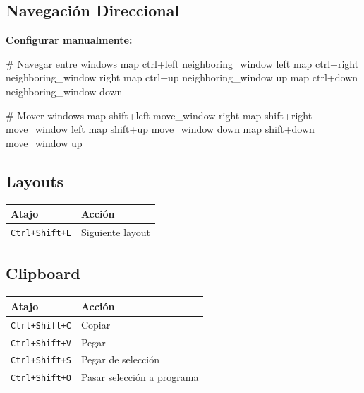\documentclass[
  doc,
  floatsintext,
  longtable,
  a4paper,
  nolmodern,
  notxfonts,
  notimes,
  12pt,
  colorlinks=true,linkcolor=blue,citecolor=blue,urlcolor=blue]{apa7}
\newenvironment{Shaded}{\begin{snugshade}}{\end{snugshade}}
\newcommand{\CommentTok}[1]{\textcolor[rgb]{0.37,0.37,0.37}{#1}}
\newcommand{\DataTypeTok}[1]{\textcolor[rgb]{0.68,0.00,0.00}{#1}}
\newcommand{\ErrorTok}[1]{\textcolor[rgb]{0.68,0.00,0.00}{#1}}
\newcounter{none} %
\begin{document}
\subsection{Navegación Direccional}\label{navegaciuxf3n-direccional}

\textbf{Configurar manualmente:}

\begin{Shaded}
\begin{Highlighting}[]
\CommentTok{\# Navegar entre windows}
\DataTypeTok{map} \DataTypeTok{ctrl}\ErrorTok{+}\DataTypeTok{left} \DataTypeTok{neighboring\_window} \DataTypeTok{left}
\DataTypeTok{map} \DataTypeTok{ctrl}\ErrorTok{+}\DataTypeTok{right} \DataTypeTok{neighboring\_window} \DataTypeTok{right}
\DataTypeTok{map} \DataTypeTok{ctrl}\ErrorTok{+}\DataTypeTok{up} \DataTypeTok{neighboring\_window} \DataTypeTok{up}
\DataTypeTok{map} \DataTypeTok{ctrl}\ErrorTok{+}\DataTypeTok{down} \DataTypeTok{neighboring\_window} \DataTypeTok{down}

\CommentTok{\# Mover windows}
\DataTypeTok{map} \DataTypeTok{shift}\ErrorTok{+}\DataTypeTok{left} \DataTypeTok{move\_window} \DataTypeTok{right}
\DataTypeTok{map} \DataTypeTok{shift}\ErrorTok{+}\DataTypeTok{right} \DataTypeTok{move\_window} \DataTypeTok{left}
\DataTypeTok{map} \DataTypeTok{shift}\ErrorTok{+}\DataTypeTok{up} \DataTypeTok{move\_window} \DataTypeTok{down}
\DataTypeTok{map} \DataTypeTok{shift}\ErrorTok{+}\DataTypeTok{down} \DataTypeTok{move\_window} \DataTypeTok{up}
\end{Highlighting}
\end{Shaded}

\subsection{Layouts}\label{layouts}

{\def\LTcaptype{none} %
\begin{longtable}[]{@{}ll@{}}
\toprule\noalign{}
Atajo & Acción \\
\midrule\noalign{}
\endhead
\bottomrule\noalign{}
\endlastfoot
\texttt{Ctrl+Shift+L} & Siguiente layout \\
\end{longtable}
}

\subsection{Clipboard}\label{clipboard}

{\def\LTcaptype{none} %
\begin{longtable}[]{@{}ll@{}}
\toprule\noalign{}
Atajo & Acción \\
\midrule\noalign{}
\endhead
\bottomrule\noalign{}
\endlastfoot
\texttt{Ctrl+Shift+C} & Copiar \\
\texttt{Ctrl+Shift+V} & Pegar \\
\texttt{Ctrl+Shift+S} & Pegar de selección \\
\texttt{Ctrl+Shift+O} & Pasar selección a programa \\
\end{longtable}
}
\end{document}
